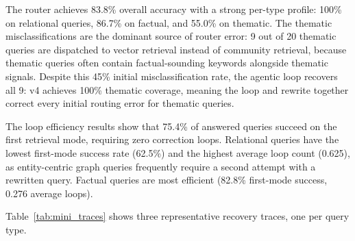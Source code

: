\documentclass[11pt]{article}
\begin{document}
\begin{table}[t]
\centering
\small
{}
\caption{Router confusion matrix (v4, $n=80$). Relational queries are
         never misclassified. Thematic queries are the primary source of
         router error, with 9 out of 20 dispatched to vector retrieval.}
\label{tab:confusion}
\end{table}

The router achieves 83.8\% overall accuracy with a strong per-type
profile: 100\% on relational queries, 86.7\% on factual, and 55.0\% on
thematic. The thematic misclassifications are the dominant source of router
error: 9 out of 20 thematic queries are dispatched to vector retrieval
instead of community retrieval, because thematic queries often contain
factual-sounding keywords alongside thematic signals. Despite this 45\%
initial misclassification rate, the agentic loop recovers all 9: v4
achieves 100\% thematic coverage, meaning the loop and rewrite together
correct every initial routing error for thematic queries.

The loop efficiency results show that 75.4\% of answered queries succeed on
the first retrieval mode, requiring zero correction loops. Relational
queries have the lowest first-mode success rate (62.5\%) and the highest
average loop count (0.625), as entity-centric graph queries frequently
require a second attempt with a rewritten query. Factual queries are most
efficient (82.8\% first-mode success, 0.276 average loops).

Table~\ref{tab:mini_traces} shows three representative recovery traces, one
per query type.
\end{document}
